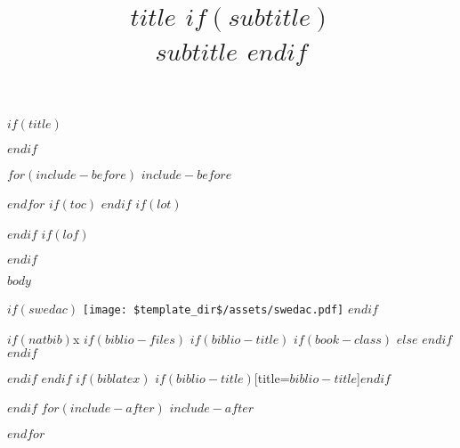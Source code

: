 \documentclass[12pt]{article}
\title{
	\vspace{0.5cm}
	{\fontsize{32}{36}\selectfont $title$}
	$if(subtitle)$
		\\\vspace{0.5em}
		{\fontsize{24}{28}\selectfont $subtitle$}
	$endif$
	\\\headrule
	\vspace{-2cm}
}
\date{}
\author{}
\begin{document}
$if(title)$\maketitle$endif$
\thispagestyle{fancyplain}

$for(include-before)$
$include-before$

$endfor$
$if(toc)$
{
\hypersetup{linkcolor=black}
\setcounter{tocdepth}{$toc-depth$}
\tableofcontents
}
$endif$
$if(lot)$
\listoftables
$endif$
$if(lof)$
\listoffigures
$endif$

$body$

$if(swedac)$
\vspace{1cm}
\centering
\texttt{[image: \$template\_dir\$/assets/swedac.pdf]}
$endif$

$if(natbib)$x
$if(biblio-files)$
$if(biblio-title)$
$if(book-class)$
\renewcommand\bibname{$biblio-title$}
$else$
\renewcommand\refname{$biblio-title$}
$endif$
$endif$


$endif$
$endif$
$if(biblatex)$
\printbibliography$if(biblio-title)$[title=$biblio-title$]$endif$

$endif$
$for(include-after)$
$include-after$

$endfor$
\end{document}
